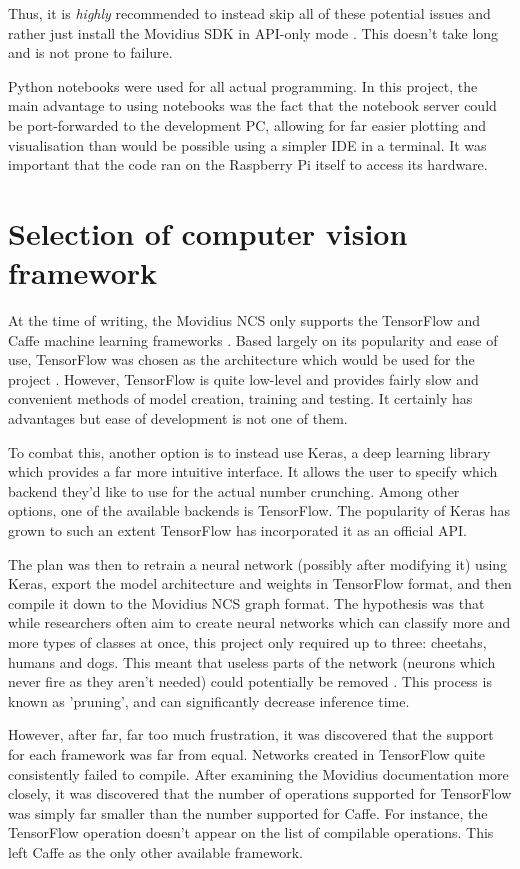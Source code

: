 Thus, it is \emph{highly} recommended to instead skip all of these potential issues and rather just install the Movidius SDK in API-only mode \cite{movidius_api_only}. This doesn't take long and is not prone to failure.

Python notebooks were used for all actual programming. In this project, the main advantage to using notebooks was the fact that the notebook server could be port-forwarded to the development PC, allowing for far easier plotting and visualisation than would be possible using a simpler IDE in a terminal. It was important that the code ran on the Raspberry Pi itself to access its hardware.


\section{Selection of computer vision framework}
At the time of writing, the Movidius NCS only supports the TensorFlow and Caffe machine learning frameworks \cite{website:movidius_install}. Based largely on its popularity and ease of use, TensorFlow was chosen as the architecture which would be used for the project \cite{website:tensorflow_popularity}. However, TensorFlow is quite low-level and provides fairly slow and convenient methods of model creation, training and testing. It certainly has advantages but ease of development is not one of them.

To combat this, another option is to instead use Keras, a deep learning library which provides a far more intuitive interface. It allows the user to specify which backend they'd like to use for the actual number crunching. Among other options, one of the available backends is TensorFlow. The popularity of Keras has grown to such an extent TensorFlow has incorporated it as an official API.

The plan was then to retrain a neural network (possibly after modifying it) using Keras, export the model architecture and weights in TensorFlow format, and then compile it down to the Movidius NCS graph format. The hypothesis was that while researchers often aim to create neural networks which can classify more and more types of classes at once, this project only required up to three: cheetahs, humans and dogs. This meant that useless parts of the network (neurons which never fire as they aren't needed) could potentially be removed \cite{molchanov2016pruning}. This process is known as 'pruning', and can significantly decrease inference time.

However, after far, far too much frustration, it was discovered that the support for each framework was far from equal. Networks created in TensorFlow quite consistently failed to compile. After examining the Movidius documentation more closely, it was discovered that the number of operations supported for TensorFlow was simply far smaller than the number supported for Caffe. For instance, the TensorFlow  operation doesn't appear on the list of compilable operations. This left Caffe as the only other available framework.

